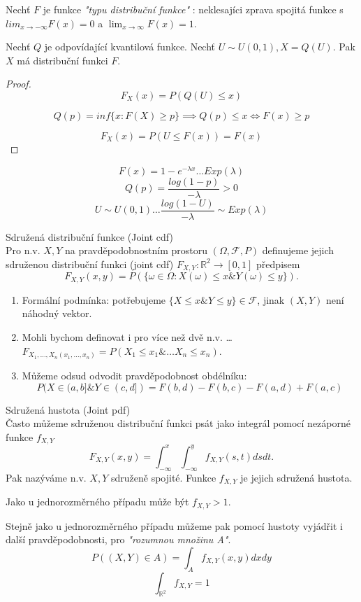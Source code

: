 \documentclass[../main.tex]{subfiles}
\begin{document}
\begin{theorem}
    Nechť $F$ je funkce \textit{"typu distribuční funkce"} : neklesajíci zprava spojitá funkce s $lim_{x\rightarrow -\infty} F(x) = 0$ a $\lim_{x \rightarrow \infty} F(x) = 1$.

    Nechť $Q$ je odpovídající kvantilová funkce. Nechť $U \sim U(0,1), X = Q(U)$. Pak $X$ má distribuční funkci $F$.

    \begin{proof}
        \[F_X(x) = P(Q(U) \leq x)\]
        \begin{remark}
            \[Q(p) = inf\{x: F(X) \geq p\} \implies Q(p) \leq x \Leftrightarrow F(x) \geq p\]
        \end{remark}
        \[F_X(x) = P(U \leq F(x)) = F(x)\]
    \end{proof}
\end{theorem}

\begin{example}
    \[F(x) = 1-e^{-\lambda x} \dots Exp(\lambda)\]
    \[Q(p) = \frac{log(1-p)}{-\lambda} > 0\]
    \[U \sim U(0,1) \dots \frac{log(1-U)}{-\lambda} \sim Exp(\lambda)\]
\end{example}

\begin{definition}
    Sdružená distribuční funkce (Joint cdf)\\

    Pro n.v. $X,Y$ na pravděpodobnostním prostoru $(\Omega,\mathcal{F},P)$ definujeme
    jejich sdruženou distribuční funkci (joint cdf) $F_{X,Y} : \mathbb{R}^2 \rightarrow [0,1]$ předpisem
    \[F_{X,Y}(x,y) = P(\{\omega \in \Omega : X(\omega) \leq x \& Y(\omega) \leq y\}).\]
    \begin{enumerate}
        \item Formální podmínka: potřebujeme $\{X\leq x \& Y \leq y\} \in \mathcal{F}$, jinak $(X,Y)$ není náhodný vektor.
        \item Mohli bychom definovat i pro více než dvě n.v. \dots $F_{X_1,\dots
            ,X_n(x_1,\dots ,x_n)} = P(X_1 \leq x_1 \& \dots X_n \leq x_n)$.
        \item Můžeme odsud odvodit pravděpodobnost obdélníku:
        \[P(X \in (a,b] \& Y \in (c,d]) = F(b,d) - F(b,c) - F(a,d) + F(a,c)\]
    \end{enumerate}
\end{definition}

\begin{definition}
    Sdružená hustota (Joint pdf)\\

    Často můžeme sdruženou distribuční funkci psát jako integrál pomocí nezáporné funkce $f_{X,Y}$
    \[F_{X,Y}(x,y) = \int^x_{-\infty}\int^y_{-\infty} f_{X,Y}(s,t)dsdt.\]
    Pak nazýváme n.v. $X,Y$ sdruženě spojité. Funkce $f_{X,Y}$ je jejich sdružená hustota.

    Jako u jednorozměrného případu může být $f_{X,Y} > 1$.

    Stejně jako u jednorozměrného případu můžeme pak pomocí hustoty vyjádřit i další pravděpodobnosti,
    pro \textit{"rozumnou množinu A"}.
    \[P((X,Y)\in A) = \int_A f_{X,Y}(x,y)dxdy\]
    \[\int_{\mathbb{R}^2} f_{X,Y} = 1\]
\end{definition}
\end{document}
